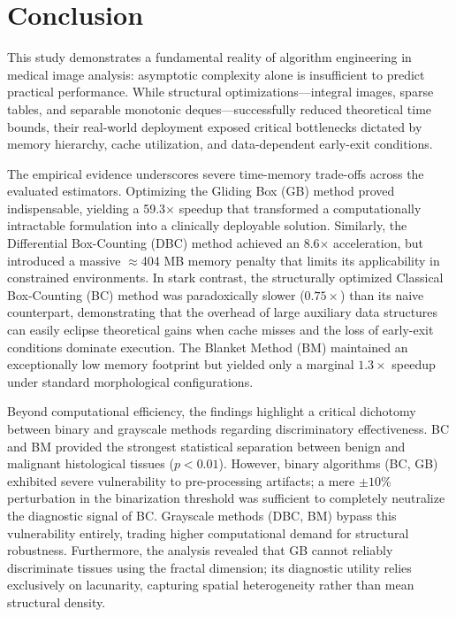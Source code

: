 \section{Conclusion}
\label{sec:conclusion}

This study demonstrates a fundamental reality of algorithm engineering in medical image analysis: asymptotic complexity alone is insufficient to predict practical performance. While structural optimizations—integral images, sparse tables, and separable monotonic deques—successfully reduced theoretical time bounds, their real-world deployment exposed critical bottlenecks dictated by memory hierarchy, cache utilization, and data-dependent early-exit conditions.

The empirical evidence underscores severe time-memory trade-offs across the evaluated estimators. Optimizing the Gliding Box (GB) method proved indispensable, yielding a 59.3$\times$ speedup that transformed a computationally intractable formulation into a clinically deployable solution. Similarly, the Differential Box-Counting (DBC) method achieved an 8.6$\times$ acceleration, but introduced a massive $\approx$404 MB memory penalty that limits its applicability in constrained environments. In stark contrast, the structurally optimized Classical Box-Counting (BC) method was paradoxically slower ($0.75\times$) than its naive counterpart, demonstrating that the overhead of large auxiliary data structures can easily eclipse theoretical gains when cache misses and the loss of early-exit conditions dominate execution. The Blanket Method (BM) maintained an exceptionally low memory footprint but yielded only a marginal $1.3\times$ speedup under standard morphological configurations.

Beyond computational efficiency, the findings highlight a critical dichotomy between binary and grayscale methods regarding discriminatory effectiveness. BC and BM provided the strongest statistical separation between benign and malignant histological tissues ($p < 0.01$). However, binary algorithms (BC, GB) exhibited severe vulnerability to pre-processing artifacts; a mere $\pm10\%$ perturbation in the binarization threshold was sufficient to completely neutralize the diagnostic signal of BC. Grayscale methods (DBC, BM) bypass this vulnerability entirely, trading higher computational demand for structural robustness. Furthermore, the analysis revealed that GB cannot reliably discriminate tissues using the fractal dimension; its diagnostic utility relies exclusively on lacunarity, capturing spatial heterogeneity rather than mean structural density.

